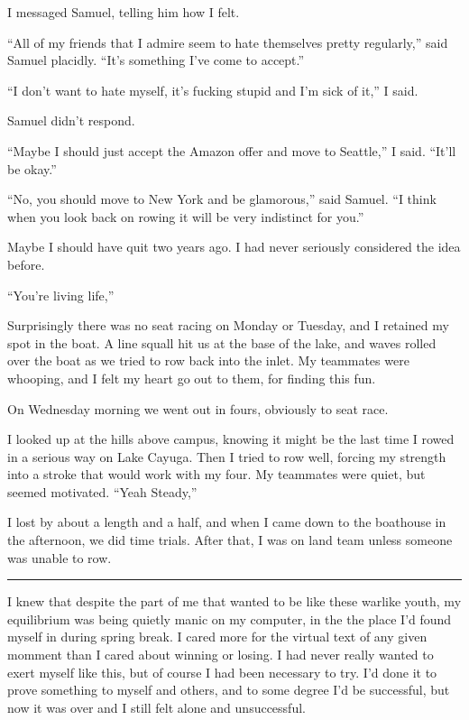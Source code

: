 I messaged Samuel, telling him how I felt.

``All of my friends that I admire seem to hate themselves pretty regularly,''
said Samuel placidly.  ``It's something I've come to accept.''

``I don't want to hate myself, it's fucking stupid and I'm sick of it,'' I said.  

Samuel didn't respond.

``Maybe I should just accept the Amazon offer and move to Seattle,'' I said.
``It'll be okay.''

``No, you should move to New York and be glamorous,'' said Samuel.  ``I think
when you look back on rowing it will be very indistinct for you.'' 

Maybe I should have quit two years ago.  I had never seriously considered the
idea before.

``You're living life,''

Surprisingly there was no seat racing on Monday or Tuesday, and I retained my
spot in the boat.  A line squall hit us at the base of the lake, and waves
rolled over the boat as we tried to row back into the inlet.  My teammates were
whooping, and I felt my heart go out to them, for finding this fun.

On Wednesday morning we went out in fours, obviously to seat race.

I looked up at the hills above campus, knowing it might be the last time I rowed
in a serious way on Lake Cayuga.  Then I tried to row well, forcing my strength
into a stroke that would work with my four.  My teammates were quiet, but seemed
motivated. ``Yeah Steady,'' 

I lost by about a length and a half, and when I came down to the boathouse in
the afternoon, we did time trials.  After that, I was on land team unless
someone was unable to row.

\plainfancybreak{12pt}{2}{* * *}

I knew that despite the part of me that wanted to be like these warlike youth,
my equilibrium was being quietly manic on my computer, in the the place I'd
found myself in during spring break.  I cared more for the virtual text of any
given momment than I cared about winning or losing.  I had never really wanted
to exert myself like this, but of course I had been necessary to try.  I'd done
it to prove something to myself and others, and to some degree I'd be
successful, but now it was over and I still felt alone and unsuccessful.

